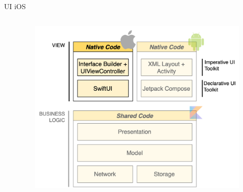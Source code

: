 \begin{frame}{UI iOS}
    \begin{columns}[onlytextwidth]
        \begin{column}{0.4\textwidth}

        \end{column}
        \begin{column}{0.6\textwidth}
             \begin{figure}[H]
                \includegraphics[width=1\textwidth]{img/stack_kmm_ios.png}
            \end{figure}
        \end{column}
    \end{columns}
\end{frame}


